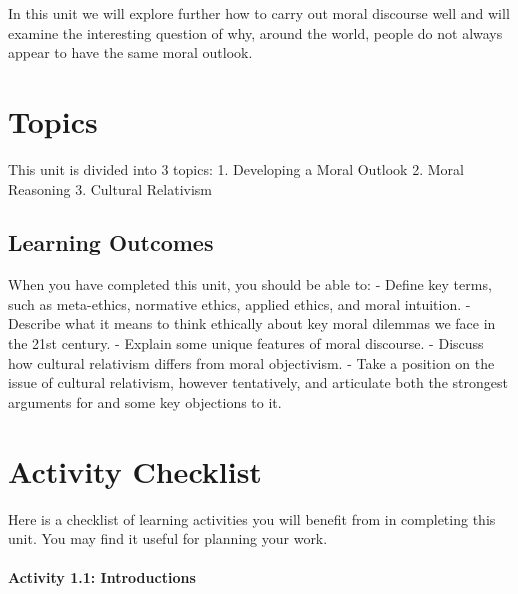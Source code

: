 \documentclass[
]{book}
\begin{document}
In this unit we will explore further how to carry out moral discourse well and will examine the interesting question of why, around the world, people do not always appear to have the same moral outlook.

\hypertarget{topics}{%
\section{Topics}\label{topics}}

This unit is divided into 3 topics:
1. Developing a Moral Outlook
2. Moral Reasoning
3. Cultural Relativism

\hypertarget{learning-outcomes}{%
\subsection*{Learning Outcomes}\label{learning-outcomes}}

When you have completed this unit, you should be able to:
- Define key terms, such as meta-ethics, normative ethics, applied ethics, and moral intuition.
- Describe what it means to think ethically about key moral dilemmas we face in the 21st century.
- Explain some unique features of moral discourse.
- Discuss how cultural relativism differs from moral objectivism.
- Take a position on the issue of cultural relativism, however tentatively, and articulate both the strongest arguments for and some key objections to it.

\hypertarget{activity-checklist}{%
\section{Activity Checklist}\label{activity-checklist}}

Here is a checklist of learning activities you will benefit from in completing this unit. You may find it useful for planning your work.

\hypertarget{activity-1.1-introductions}{%
\paragraph{Activity 1.1: Introductions}\label{activity-1.1-introductions}}
\end{document}
